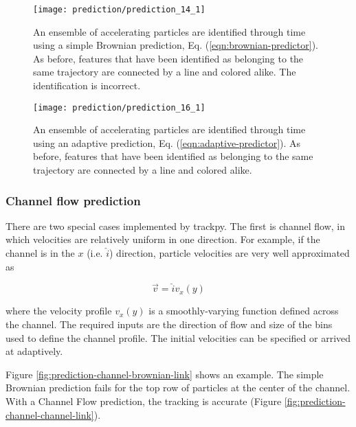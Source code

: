    \begin{figure}
    \centering
    \texttt{[image: prediction/prediction\_14\_1]}
    \caption[An ensemble of accelerating particles are identified through time using a simple Brownian prediction.]{\label{fig:prediction-acceleration-brownian-link}An ensemble of accelerating particles are identified through time using a simple Brownian prediction, Eq. (\ref{eqn:brownian-predictor}). As before, features that have been identified as belonging to the same trajectory are connected by a line and colored alike. The identification is incorrect.}
    \end{figure}
   

   \begin{figure}
    \centering
    \texttt{[image: prediction/prediction\_16\_1]}
    \caption[An ensemble of accelerating particles are identified through time using an adaptive prediction.]{\label{fig:prediction-acceleration-adaptive-link}An ensemble of accelerating particles are identified through time using an adaptive prediction, Eq. (\ref{eqn:adaptive-predictor}). As before, features that have been identified as belonging to the same trajectory are connected by a line and colored alike. }
    \end{figure}


    \subsubsection{Channel flow prediction}\label{channel-flow-prediction}

There are two special cases implemented by trackpy. The first is channel flow, in which velocities are relatively uniform in one
direction. For example, if the channel is in the $x$ (i.e. $\hat i$)
direction, particle velocities are very well approximated as

\begin{equation}
\vec v = \hat i v_x(y)
\end{equation}

\noindent where the velocity profile $v_x(y)$ is a smoothly-varying function
defined across the channel. The required inputs are the direction of flow and size of the bins used to
define the channel profile. The initial velocities can be specified or arrived at adaptively.

Figure \ref{fig:prediction-channel-brownian-link} shows an example. The simple Brownian prediction fails for the top row of particles at the center of the channel. With a Channel Flow prediction, the tracking is accurate (Figure \ref{fig:prediction-channel-channel-link}).

